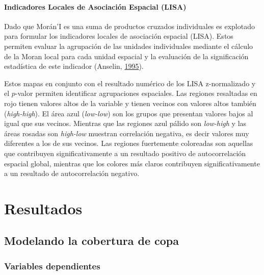\documentclass[12pt,a4paper,oneside, openany]{book}
\theoremstyle{definition}
\theoremstyle{definition}
\theoremstyle{definition}
\theoremstyle{remark}
\begin{document}
\subsubsection{Indicadores Locales de Asociación Espacial
(LISA)}\label{indicadores-locales-de-asociaciuxf3n-espacial-lisa}

Dado que Morán'I es una suma de productos cruzados individuales es
explotado para formular los indicadores locales de asociación espacial
(LISA). Estos permiten evaluar la agrupación de las unidades
individuales mediante el cálculo de la Moran local para cada unidad
espacial y la evaluación de la significación estadística de este
indicador (Anselin, \protect\hyperlink{ref-anselin1995local}{1995}).

Estos mapas en conjunto con el resultado numérico de los LISA
z-normalizado y el \(p\)-valor permiten identificar agrupaciones
espaciales. Las regiones resaltadas en rojo tienen valores altos de la
variable y tienen vecinos con valores altos también (\emph{high-high}).
El área azul (\emph{low-low}) son los grupos que presentan valores bajos
al igual que sus vecinos. Mientras que las regiones azul pálido son
\emph{low-high} y las áreas rosadas son \emph{high-low} muestran
correlación negativa, es decir valores muy diferentes a los de sus
vecinos. Las regiones fuertemente coloreadas son aquellas que
contribuyen significativamente a un resultado positivo de
autocorrelación espacial global, mientras que los colores más claros
contribuyen significativamente a un resultado de autocorrelación
negativo.

\chapter{Resultados}\label{results}

\section{Modelando la cobertura de
copa}\label{modelando-la-cobertura-de-copa}

\subsection{Variables dependientes}\label{variables-dependientes}
\end{document}
